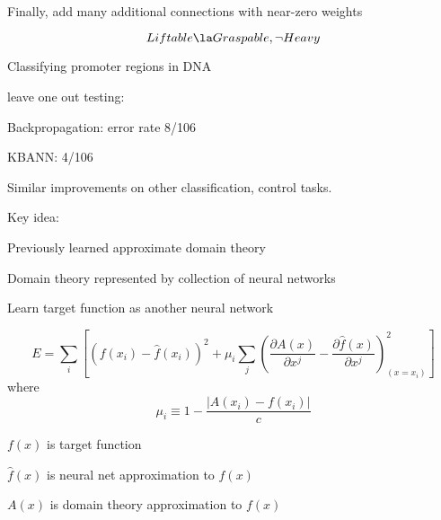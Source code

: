 \bigskip
Finally, add many additional connections with near-zero weights
\bigskip

\[ Liftable \la Graspable, \neg Heavy \]



 \bk
\centerline{\hbox{}}

 \bk

Classifying promoter regions in DNA

leave one out testing:
\bi
\item Backpropagation: error rate 8/106
\item KBANN: 4/106
\ei


\bigskip
Similar improvements on other classification, control tasks.

 \bk

\centerline{\hbox{}}

 \bk

Key idea:
\bi
\item Previously learned approximate domain theory
\item Domain theory represented by collection of neural networks
\item Learn target function as another neural network
\ei

\newpage
\centerline{\hbox{}}

 \bk

\[ E = \sum_i \left[(f(x_{i}) - \hat{f}(x_{i}))^{2} + \mu_{i} \sum_{j}
\left(\frac{\partial A(x)}{\partial x^{j}} - \frac{\partial \hat{f}(x)}{\partial{x^{j}}} \right)_{(x=x_{i})}^{2} \right] \]
where
\[ \mu_{i} \equiv 1 - \frac{|A(x_{i}) - f(x_{i})|}{c} \]

\bigskip 

\bi
\item $f(x)$ is target function
\item $\hat{f}(x)$ is neural net approximation to $f(x)$
\item $A(x)$ is domain theory approximation to $f(x)$
\ei


\newpage
\centerline{\hbox{}}


 \bk

